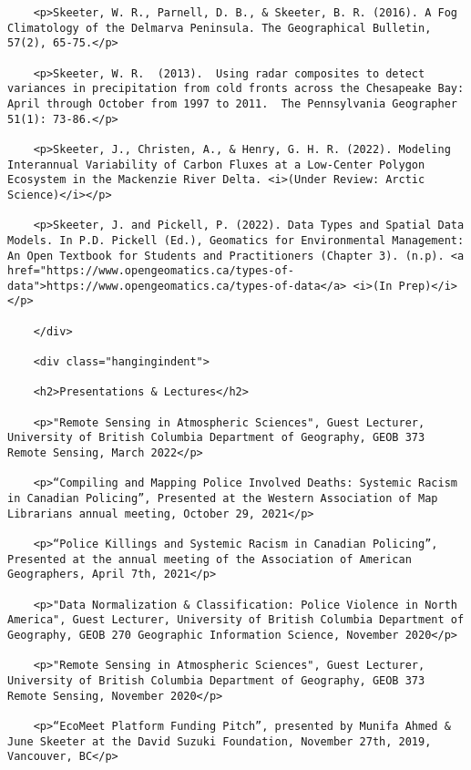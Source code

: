 \documentclass[
]{article}
\begin{document}
\begin{verbatim}
    <p>Skeeter, W. R., Parnell, D. B., & Skeeter, B. R. (2016). A Fog Climatology of the Delmarva Peninsula. The Geographical Bulletin, 57(2), 65-75.</p>
    
    <p>Skeeter, W. R.  (2013).  Using radar composites to detect variances in precipitation from cold fronts across the Chesapeake Bay: April through October from 1997 to 2011.  The Pennsylvania Geographer 51(1): 73-86.</p>
    
    <p>Skeeter, J., Christen, A., & Henry, G. H. R. (2022). Modeling Interannual Variability of Carbon Fluxes at a Low-Center Polygon Ecosystem in the Mackenzie River Delta. <i>(Under Review: Arctic Science)</i></p>
    
    <p>Skeeter, J. and Pickell, P. (2022). Data Types and Spatial Data Models. In P.D. Pickell (Ed.), Geomatics for Environmental Management: An Open Textbook for Students and Practitioners (Chapter 3). (n.p). <a href="https://www.opengeomatics.ca/types-of-data">https://www.opengeomatics.ca/types-of-data</a> <i>(In Prep)</i></p>
    
    </div>
    
    <div class="hangingindent">
    
    <h2>Presentations & Lectures</h2>
    
    <p>"Remote Sensing in Atmospheric Sciences", Guest Lecturer, University of British Columbia Department of Geography, GEOB 373 Remote Sensing, March 2022</p>
    
    <p>“Compiling and Mapping Police Involved Deaths: Systemic Racism in Canadian Policing”, Presented at the Western Association of Map Librarians annual meeting, October 29, 2021</p>
    
    <p>“Police Killings and Systemic Racism in Canadian Policing”, Presented at the annual meeting of the Association of American Geographers, April 7th, 2021</p>
    
    <p>"Data Normalization & Classification: Police Violence in North America", Guest Lecturer, University of British Columbia Department of Geography, GEOB 270 Geographic Information Science, November 2020</p>
    
    <p>"Remote Sensing in Atmospheric Sciences", Guest Lecturer, University of British Columbia Department of Geography, GEOB 373 Remote Sensing, November 2020</p>
    
    <p>“EcoMeet Platform Funding Pitch”, presented by Munifa Ahmed & June Skeeter at the David Suzuki Foundation, November 27th, 2019, Vancouver, BC</p>
    

\end{verbatim}
\end{document}
